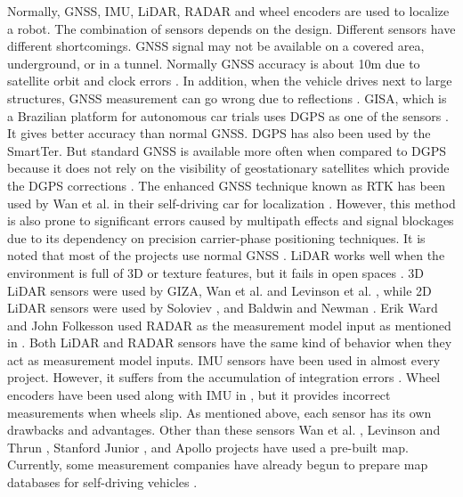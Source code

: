 Normally, \gls{GNSS}, \gls{IMU}, \gls{LiDAR}, \gls{RADAR} and wheel encoders are used to localize a robot. The combination of sensors depends on the design. Different sensors have different shortcomings. \gls{GNSS} signal may not be available on a covered area, underground, or in a tunnel. Normally \gls{GNSS} accuracy is about 10m due to satellite orbit and clock errors \cite{pa:Wan2018}. In addition, when the vehicle drives next to large structures, \gls{GNSS} measurement can go wrong due to reflections \cite{pa:Smartter}. GISA, which is a Brazilian platform for autonomous car trials uses \gls{DGPS} as one of the sensors \cite{pa:GIZA}. It gives better accuracy than normal \gls{GNSS}. \gls{DGPS} has also been used by the SmartTer. But standard \gls{GNSS} is available more often when compared to \gls{DGPS} because it does not rely on the visibility of geostationary satellites which provide the \gls{DGPS} corrections \cite{pa:Smartter}. The enhanced \gls{GNSS} technique known as \gls{RTK} has been used by Wan et al. in their self-driving car for localization \cite{pa:Wan2018}. However, this method is also prone to significant errors caused by multipath effects and signal blockages due to its dependency on precision carrier-phase positioning techniques. It is noted that most of the projects use normal \gls{GNSS}\cite{pa:StanfordJunior} \cite{pa:Soloviev2008}\cite{pa:Levinson2010}\cite{pa:Roumeliotis1999}. \gls{LiDAR} works well when the environment is full of 3D or texture features, but it fails in open spaces \cite{pa:Wan2018}. 3D \gls{LiDAR} sensors were used by GIZA\cite{pa:GIZA}, Wan et al. \cite{pa:Wan2018} and Levinson et al. \cite{pa:Levinson2011}, while 2D \gls{LiDAR} sensors were used by Soloviev \cite{pa:Soloviev2008}, \cite{pa:Soloviev2007}  and Baldwin and Newman \cite{pa:Baldwin2012}. Erik Ward and John Folkesson used \gls{RADAR} as the measurement model input as mentioned in \cite{pa:Ward2016}. Both \gls{LiDAR} and \gls{RADAR} sensors have the same kind of behavior when they act as measurement model inputs. \gls{IMU} sensors have been used in almost every project. However, it suffers from the accumulation of integration errors \cite{pa:Wan2018}. Wheel encoders have been used along with \gls{IMU} in \cite{pa:Smartter}, but it provides incorrect measurements when wheels slip. As mentioned above, each sensor has its own drawbacks and advantages. Other than these sensors Wan et al. \cite{pa:Wan2018}, Levinson and Thrun \cite{pa:Levinson2010}, Stanford Junior \cite{pa:StanfordJunior}, and Apollo \cite{pa:Apollo} projects have used a pre-built map. Currently, some measurement companies have already begun to prepare map databases for self-driving vehicles \cite{pa:Yoneda2014}.

